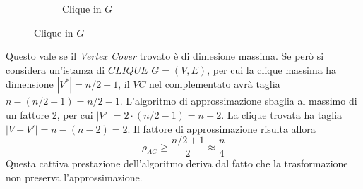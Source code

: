\begin{figure}[h]
\begin{subfigure}[b]{0.3\textwidth}
    \end{subfigure}
    \quad
    \begin{subfigure}[b]{0.3\textwidth}
        \centering
        \caption{Clique in $G$}
        \label{fig:approxclique3}
    \end{subfigure}
\end{figure}
Questo vale se il \emph{Vertex Cover} trovato è di dimesione massima. Se però si considera un'istanza di $CLIQUE$ $G=(V,E)$,
per cui la clique massima ha dimensione $|V^*|=n/2+1$, il $VC$ nel complementato avrà taglia $n-\left( n/2 +1 \right) = n/2 -1$. L'algoritmo di approssimazione sbaglia al massimo di un fattore 2, per cui $|V'|=2 \cdot \left( n/2 -1 \right) = n-2$. La clique trovata ha taglia $|V-V'|=n-\left( n-2 \right) = 2$. Il fattore di approssimazione risulta allora
\begin{equation*}
    \rho_{AC} \geq \frac{n/2+1}{2} \approx \frac{n}{4}
\end{equation*}
Questa cattiva prestazione dell'algoritmo deriva dal fatto che la trasformazione non preserva l'approssimazione.


